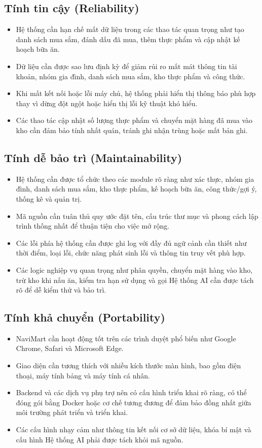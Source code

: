 \subsection{Tính tin cậy (Reliability)}
\begin{itemize}
    \item Hệ thống cần hạn chế mất dữ liệu trong các thao tác quan trọng như tạo danh sách mua sắm, đánh dấu đã mua, thêm thực phẩm và cập nhật kế hoạch bữa ăn.
    \item Dữ liệu cần được sao lưu định kỳ để giảm rủi ro mất mát thông tin tài khoản, nhóm gia đình, danh sách mua sắm, kho thực phẩm và công thức.
    \item Khi mất kết nối hoặc lỗi máy chủ, hệ thống phải hiển thị thông báo phù hợp thay vì dừng đột ngột hoặc hiển thị lỗi kỹ thuật khó hiểu.
    \item Các thao tác cập nhật số lượng thực phẩm và chuyển mặt hàng đã mua vào kho cần đảm bảo tính nhất quán, tránh ghi nhận trùng hoặc mất bản ghi.
\end{itemize}

\subsection{Tính dễ bảo trì (Maintainability)}
\begin{itemize}
    \item Hệ thống cần được tổ chức theo các module rõ ràng như xác thực, nhóm gia đình, danh sách mua sắm, kho thực phẩm, kế hoạch bữa ăn, công thức/gợi ý, thống kê và quản trị.
    \item Mã nguồn cần tuân thủ quy ước đặt tên, cấu trúc thư mục và phong cách lập trình thống nhất để thuận tiện cho việc mở rộng.
    \item Các lỗi phía hệ thống cần được ghi log với đầy đủ ngữ cảnh cần thiết như thời điểm, loại lỗi, chức năng phát sinh lỗi và thông tin truy vết phù hợp.
    \item Các logic nghiệp vụ quan trọng như phân quyền, chuyển mặt hàng vào kho, trừ kho khi nấu ăn, kiểm tra hạn sử dụng và gọi Hệ thống AI cần được tách rõ để dễ kiểm thử và bảo trì.
\end{itemize}

\subsection{Tính khả chuyển (Portability)}
\begin{itemize}
    \item NaviMart cần hoạt động tốt trên các trình duyệt phổ biến như Google Chrome, Safari và Microsoft Edge.
    \item Giao diện cần tương thích với nhiều kích thước màn hình, bao gồm điện thoại, máy tính bảng và máy tính cá nhân.
    \item Backend và các dịch vụ phụ trợ nên có cấu hình triển khai rõ ràng, có thể đóng gói bằng Docker hoặc cơ chế tương đương để đảm bảo đồng nhất giữa môi trường phát triển và triển khai.
    \item Các cấu hình nhạy cảm như thông tin kết nối cơ sở dữ liệu, khóa bí mật và cấu hình Hệ thống AI phải được tách khỏi mã nguồn.
\end{itemize}

